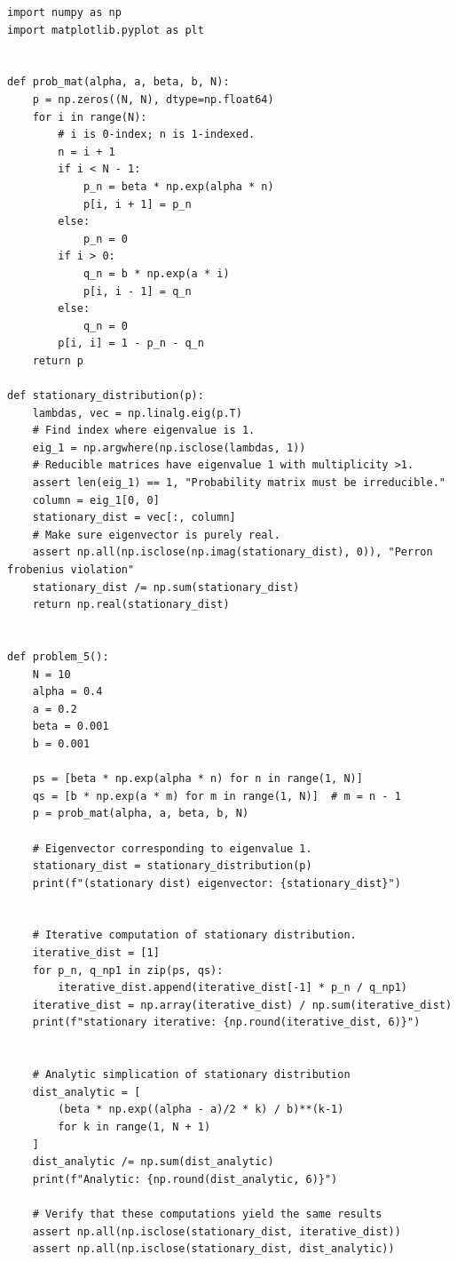 \documentclass{homework}
\begin{document}
\begin{lstlisting}[caption=Problems 5+6 Python Code]
import numpy as np
import matplotlib.pyplot as plt


def prob_mat(alpha, a, beta, b, N):
    p = np.zeros((N, N), dtype=np.float64)
    for i in range(N):
        # i is 0-index; n is 1-indexed.
        n = i + 1
        if i < N - 1:
            p_n = beta * np.exp(alpha * n)
            p[i, i + 1] = p_n
        else:
            p_n = 0
        if i > 0:
            q_n = b * np.exp(a * i)
            p[i, i - 1] = q_n
        else:
            q_n = 0
        p[i, i] = 1 - p_n - q_n
    return p

def stationary_distribution(p):
    lambdas, vec = np.linalg.eig(p.T)
    # Find index where eigenvalue is 1.
    eig_1 = np.argwhere(np.isclose(lambdas, 1))
    # Reducible matrices have eigenvalue 1 with multiplicity >1.
    assert len(eig_1) == 1, "Probability matrix must be irreducible."
    column = eig_1[0, 0]
    stationary_dist = vec[:, column]
    # Make sure eigenvector is purely real.
    assert np.all(np.isclose(np.imag(stationary_dist), 0)), "Perron frobenius violation"
    stationary_dist /= np.sum(stationary_dist)
    return np.real(stationary_dist)


def problem_5():
    N = 10
    alpha = 0.4
    a = 0.2
    beta = 0.001
    b = 0.001

    ps = [beta * np.exp(alpha * n) for n in range(1, N)]
    qs = [b * np.exp(a * m) for m in range(1, N)]  # m = n - 1
    p = prob_mat(alpha, a, beta, b, N)

    # Eigenvector corresponding to eigenvalue 1.
    stationary_dist = stationary_distribution(p)
    print(f"(stationary dist) eigenvector: {stationary_dist}")


    # Iterative computation of stationary distribution.
    iterative_dist = [1]
    for p_n, q_np1 in zip(ps, qs):
        iterative_dist.append(iterative_dist[-1] * p_n / q_np1)
    iterative_dist = np.array(iterative_dist) / np.sum(iterative_dist)
    print(f"stationary iterative: {np.round(iterative_dist, 6)}")


    # Analytic simplication of stationary distribution
    dist_analytic = [
        (beta * np.exp((alpha - a)/2 * k) / b)**(k-1)
        for k in range(1, N + 1)
    ]
    dist_analytic /= np.sum(dist_analytic)
    print(f"Analytic: {np.round(dist_analytic, 6)}")

    # Verify that these computations yield the same results
    assert np.all(np.isclose(stationary_dist, iterative_dist))
    assert np.all(np.isclose(stationary_dist, dist_analytic))


\end{lstlisting}
\end{document}

